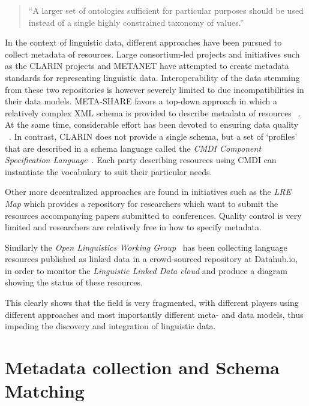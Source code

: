 \documentclass[11pt]{article}
\begin{document}
\begin{quote}
``A larger set of ontologies sufficient for particular purposes should
be used instead of a single highly constrained taxonomy of values.''
\end{quote}



In the context of linguistic data, different approaches have been pursued to collect metadata of resources. 
Large consortium-led projects and initiatives such as the CLARIN projects and
METANET have attempted to create metadata standards for representing linguistic data. 
Interoperability of the data stemming from these two repositories is however severely limited to due incompatibilities in their data models.
META-SHARE favors a top-down approach in which a relatively complex XML schema is provided to describe metadata of resources ~\cite{gavrilidou2012meta}. At the same time, considerable effort has been devoted to ensuring data quality ~\cite{piperidis2012meta}.
In contrast, CLARIN does not provide a single schema, but a set of `profiles'
that are described in a schema language called the \emph{CMDI Component Specification Language}~\cite{broeder2012cmdi}. Each party describing resources using CMDI can instantiate the vocabulary to suit their particular needs.

Other more decentralized approaches are found in initiatives such as the \emph{LRE Map} which provides a repository for researchers which want to submit the resources accompanying papers submitted to conferences. Quality control is very limited and researchers are relatively free in how to specify metadata. 

Similarly the \emph{Open Linguistics Working Group}~\cite{chiarcos2012open} has
been collecting language resources published as linked data in a crowd-sourced
repository at Datahub.io, in order to monitor the \emph{Linguistic Linked Data
cloud} and produce a diagram showing the status of these resources.

This clearly shows that the field is very fragmented, with different
players using different approaches and most importantly different meta- and 
data models, thus impeding the discovery and integration of linguistic data. 

\section{Metadata collection and Schema Matching}
\end{document}
